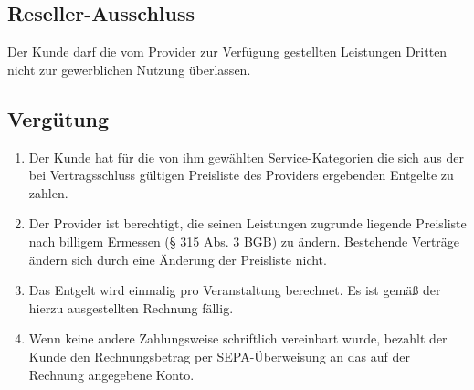 \documentclass{terms}
\begin{document}
\subsection{Reseller-Ausschluss}

Der Kunde darf die vom Provider zur Verfügung gestellten Leistungen Dritten nicht zur gewerblichen Nutzung überlassen.

\subsection{Vergütung}
\begin{enumerate}
\item Der Kunde hat für die von ihm gewählten Service-Kategorien die sich aus der bei Vertragsschluss gültigen Preisliste des Providers ergebenden Entgelte zu zahlen.
\item Der Provider ist berechtigt, die seinen Leistungen zugrunde liegende Preisliste nach billigem Ermessen (§ 315 Abs. 3 BGB) zu ändern.
      Bestehende Verträge ändern sich durch eine Änderung der Preisliste nicht.
\item Das Entgelt wird einmalig pro Veranstaltung berechnet.
      Es ist gemäß der hierzu ausgestellten Rechnung fällig.
\item Wenn keine andere Zahlungsweise schriftlich vereinbart wurde, bezahlt der Kunde den Rechnungsbetrag per SEPA-Überweisung an das auf der Rechnung angegebene Konto.
\end{enumerate}
\end{document}
